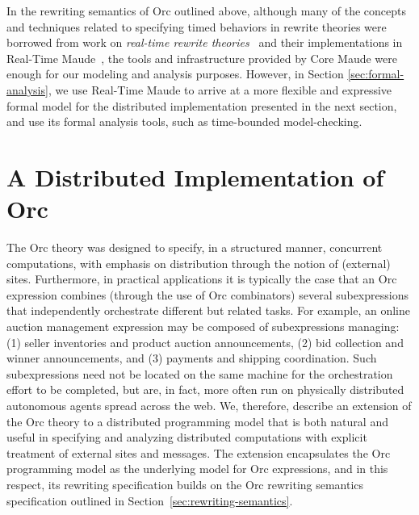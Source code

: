 \documentclass{eptcs}
\begin{document}
In the rewriting semantics of Orc outlined above, although many of the concepts and techniques related to specifying timed behaviors in rewrite theories were borrowed from work on \emph{real-time rewrite theories}~\cite{journ-rtm} and their implementations in Real-Time Maude~\cite{RTMManual07}, the tools and infrastructure provided by Core Maude were enough for our modeling and analysis purposes. However, in Section \ref{sec:formal-analysis}, we use Real-Time Maude to arrive at a more flexible and expressive formal model for the distributed implementation presented in the next section, and use its formal analysis tools, such as time-bounded model-checking.





\section{A Distributed Implementation of Orc} \label{sec:dist-orc}


The Orc theory was designed to specify, in a structured manner, concurrent computations, with emphasis on distribution through the notion of (external) sites. Furthermore, in practical applications it is typically the case that an Orc expression combines (through the use of Orc combinators) several subexpressions that independently orchestrate different but related tasks. For example, an online auction management expression may be composed of subexpressions managing: (1) seller inventories and product auction announcements, (2) bid collection and winner announcements, and (3) payments and shipping coordination. Such subexpressions need not be located on the same machine for the orchestration effort to be completed, but are, in fact, more often run on physically distributed autonomous agents spread across the web. We, therefore, describe an extension of the Orc theory to a distributed programming model that is both natural and useful in specifying and analyzing distributed computations with explicit treatment of external sites and messages. The extension encapsulates the Orc programming model as the underlying model for Orc expressions, and in this respect, its rewriting specification builds on the Orc rewriting semantics specification  outlined in Section~\ref{sec:rewriting-semantics}. 
\end{document}
